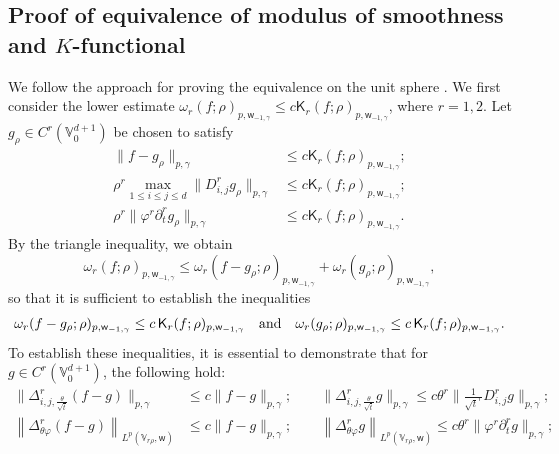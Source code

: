 \documentclass{amsart}
\theoremstyle{remark}
\def\g{{\gamma}}
\def\t{{\theta}}
\def\o{{\omega}}
\def\VV{{\mathbb V}}
\def\sK{{\mathsf K}}
\def\sw{{\mathsf w}}
\def\g{{\gamma}}
\def\t{{\theta}}
\def\o{{\omega}}
\def\VV{{\mathbb V}}
\def\f{\frac}
\def\f{\frac}
\begin{document}
\subsection{Proof of equivalence of modulus of smoothness and $K$-functional}
We follow the approach for proving the equivalence on the unit sphere \cite[Theorems 6.10 and 6.14]{DaiX2}.
We first consider the lower estimate $ \o_r(f; \rho)_{p,\sw_{-1,\g}}\leq c  \sK_r(f; \rho)_{p,\sw_{-1,\g}}$, where $r=1,2$. 
Let $g_\rho\in C^r(\VV_0^{d+1})$ be chosen to satisfy 
\begin{align*}
    \|f-g_\rho\|_{p,\g}&\leq c \sK_r(f; \rho)_{p,\sw_{-1,\g}};\\
    \rho^r\max_{1\leq i\leq j\leq d}\|D_{i,j}^r g_{\rho}\|_{p,\g}&\leq c \sK_r(f; \rho)_{p,\sw_{-1,\g}};\\
      \rho^r \|\varphi^r\partial_t^r g_\rho\|_{p,\g}&\leq c \sK_r(f; \rho)_{p,\sw_{-1,\g}}.
\end{align*}
By the triangle inequality, we obtain
$$
\o_r(f; \rho)_{p,\sw_{-1,\g}} \leq \o_r(f-g_\rho; \rho)_{p,\sw_{-1,\g}}+ \o_r(g_\rho; \rho)_{p,\sw_{-1,\g}},
$$
so that it is sufficient to establish the inequalities 
\begin{align} \label{eq:o_r<K_r}
\o_r(f-g_\rho; \rho)_{p,\sw_{-1,\g}}\leq c\,  \sK_r(f; \rho)_{p,\sw_{-1,\g}} \quad \hbox{and} \quad 
\o_r(g_\rho; \rho)_{p,\sw_{-1,\g}} \le c\,\sK_r(f; \rho)_{p,\sw_{-1,\g}}.
\end{align}
To establish these inequalities, it is essential to demonstrate that for \( g \in C^r(\VV_0^{d+1}) \), the following hold:
 \begin{align*} %
 	\Big \|\Delta_{i,j,\f{\t}{\sqrt{t}}}^r (f-g)\Big \|_{p,\g} &\leq c \|f-g\|_{p,\g}; \qquad 
	\Big\|\Delta_{i,j,\f{\t}{\sqrt{t}}}^r g\Big\|_{p,\g} \leq c \t^r \Big \| \f{1}{\sqrt{t}^r} D_{i,j}^r g \Big\|_{p,\g};\\
	\left\| \Delta_{\t\varphi}^r (f-g)\right\|_{L^p(\VV_{r\rho},\sw) }  & \leq c \|f-g\|_{p,\g}; \qquad
	\left\| \Delta_{\t\varphi}^r g\right\|_{L^p(\VV_{r\rho},\sw) } \leq c \t^{r}\|\varphi^r \partial_t^r g\|_{p,\g}; 
\end{align*} 

 
\end{document}
